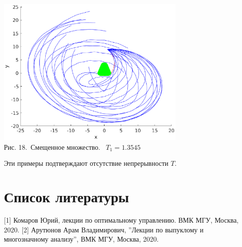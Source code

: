 \documentclass[11pt]{article}
\begin{document}
\begin{center}
	\includegraphics[width=0.7\textwidth]{pic_t_1.eps}\\
	{Рис. 18.\ Смещенное множество.  \ $T_1 = 1.3545$}
\end{center}
{Эти примеры подтверждают отсутствие непрерывности $T$.}
\newpage
{\section{Список литературы}}
{\hspace*{-0.6cm}[1] Комаров Юрий, лекции по оптимальному управлению. ВМК МГУ, Москва, 2020.}
\newline
\newline
{[2] Арутюнов Арам Владимирович, ''Лекции по выпуклому и многозначному анализу'', ВМК МГУ, Москва, 2020.}
\end{document}
